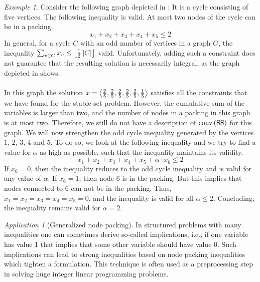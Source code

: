 \documentclass[titlepage]{book}
\theoremstyle{plain}
\theoremstyle{definition}
\theoremstyle{remark}
\newtheorem{example}{Example}
\newtheorem{application}{Application}
\begin{document}
\begin{example}
Consider the following graph depicted in : It is a cycle consisting of five vertices. The following inequality is valid. At most two nodes of the cycle can be in a packing.
\begin{equation}
x_1+x_2+x_3+x_4+x_5\leq 2
\end{equation}
In general, for a cycle $C$ with an odd number of vertices in a graph $G$, the inequality $\isumdomain[v]{C}{x_v\leq\floor{\frac{1}{2}\abs{C}}}$ valid. Unfortunately, adding such a constraint does not guarantee that the resulting solution is necessarily integral, as the graph depicted in  shows.



\paragraph{}
In this graph the solution $x=\tupl{\frac{2}{5},\frac{2}{5},\frac{2}{5},\frac{2}{5},\frac{2}{5},\frac{1}{5}}$ satisfies all the constraints that we have found for the stable set problem. However, the cumulative sum of the variables is larger than two, and the number of nodes in a packing in this graph is at most two. Therefore, we still do not have a description of $\funm{conv}{\mbox{SS}}$ for this graph. We will now strengthen the odd cycle inequality generated by the vertices $1$, $2$, $3$, $4$ and $5$. To do so, we look at the following inequality and we try to find a value for $\alpha$ as high as possible, such that the inequality maintains its validity.
\begin{equation}
x_1+x_2+x_3+x_4+x_5+\alpha\cdot x_6\leq 2
\end{equation}
If $x_6=0$, then the inequality reduces to the odd cycle inequality and is valid for any value of $\alpha$. If $x_6=1$, then node $6$ is in the packing. But this implies that nodes connected to $6$ can not be in the packing. Thus, $x_1=x_2=x_3=x_4=x_5=0$, and the inequality is valid for all $\alpha\leq 2$. Concluding, the inequality remains valid for $\alpha=2$.
\end{example}
\begin{application}[Generalized node packing]
In structured problems with many inequalities one can sometimes derive so-called implications, i.e., if one variable has value 1 that implies that some other variable should have value 0. Such implications can lead to strong inequalities based on node packing inequalities which tighten a formulation. This technique is often used as a preprocessing step in solving huge integer linear programming problems.
\end{application}
\end{document}
